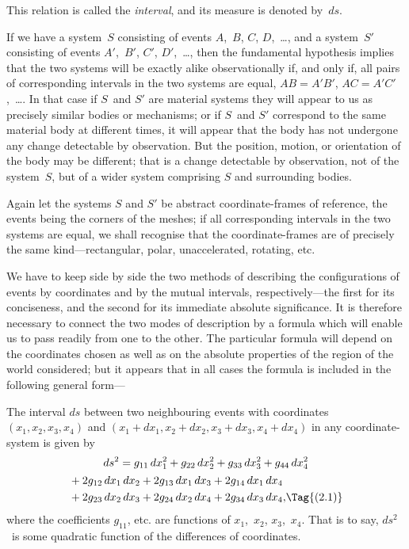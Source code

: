\documentclass[12pt]{book}
\begin{document}
This relation is called the \emph{interval}, and its measure is denoted by~$ds$.%
%

If we have a system~$S$ consisting of events $A$,~$B$, $C$, $D$,~\dots, and a system~$S'$
consisting of events $A'$,~$B'$, $C'$, $D'$,~\dots, then the fundamental hypothesis implies
that the two systems will be exactly alike observationally if, and only if, all
pairs of corresponding intervals in the two systems are equal, $AB = A'B'$,
$AC = A'C'$,~\dots. In that case if $S$~and $S'$ are material systems they will appear
to us as precisely similar bodies or mechanisms; or if $S$~and $S'$ correspond to
the same material body at different times, it will appear that the body has
not undergone any change detectable by observation. But the position,
motion, or orientation of the body may be different; that is a change detectable
by observation, not of the system~$S$, but of a wider system comprising $S$
and surrounding bodies.

Again let the systems $S$ and $S'$ be abstract coordinate-frames of reference,
the events being the corners of the meshes; if all corresponding intervals in
the two systems are equal, we shall recognise that the coordinate-frames are
of precisely the same kind---rectangular, polar, unaccelerated, rotating, etc.


We have to keep side by side the two methods of describing the configurations
of events by coordinates and by the mutual intervals, respectively---the
first for its conciseness, and the second for its immediate absolute
significance. It is therefore necessary to connect the two modes of description
by a formula which will enable us to pass readily from one to the other. The
particular formula will depend on the coordinates chosen as well as on the
absolute properties of the region of the world considered; but it appears that
in all cases the formula is included in the following general form---

The interval $ds$ between two neighbouring events with coordinates
%
$(x_{1}, x_{2}, x_{3}, x_{4})$ and $(x_{1} + dx_{1}, x_{2} + dx_{2}, x_{3} + dx_{3}, x_{4} + dx_{4})$ in any coordinate-system
is given by
\begin{multline*}
  ds^{2} = g_{11}\, dx_{1}^{2} + g_{22}\, dx_{2}^{2} + g_{33}\, dx_{3}^{2} + g_{44}\, dx_{4}^{2} \\
  \begin{aligned}[b]
    &+ 2g_{12}\, dx_{1}\, dx_{2} + 2g_{13}\, dx_{1}\, dx_{3} + 2g_{14}\, dx_{1}\, dx_{4} \\
    &+ 2g_{23}\, dx_{2}\, dx_{3} + 2g_{24}\, dx_{2}\, dx_{4} + 2g_{34}\, dx_{3}\, dx_{4},
  \end{aligned}
\Tag{(2.1)}
\end{multline*}
where the coefficients $g_{11}$, etc. are functions of $x_{1}$,~$x_{2}$, $x_{3}$,~$x_{4}$. That is to say,
$ds^{2}$~is some quadratic function of the differences of coordinates.
\end{document}

